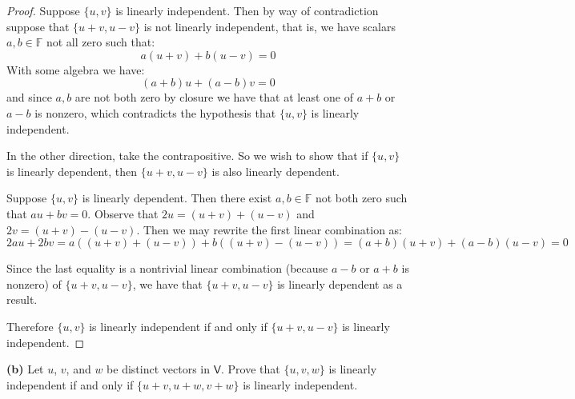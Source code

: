 \documentclass[11pt]{article}
\newcommand{\br}[1]{\left(#1\right)}
\newcommand{\cbr}[1]{\{#1\}}
\begin{document}
\begin{proof}
    Suppose $\cbr{u,v}$ is linearly independent. Then by way of contradiction suppose that $\cbr{u+v,u-v}$ is not linearly independent, that is, we have scalars $a,b\in\mathbb{F}$ not all zero such that: $$a\br{u+v}+b\br{u-v} = 0$$ With some algebra we have: $$\br{a+b}u+\br{a-b}v = 0$$ and since $a,b$ are not both zero by closure we have that at least one of $a+b$ or $a-b$ is nonzero, which contradicts the hypothesis that $\cbr{u,v}$ is linearly independent.

    In the other direction, take the contrapositive. So we wish to show that if $\cbr{u,v}$ is linearly dependent, then $\cbr{u+v,u-v}$ is also linearly dependent.

    Suppose $\cbr{u,v}$ is linearly dependent. Then there exist $a,b\in\mathbb{F}$ not both zero such that $au+bv = 0$. Observe that $2u = \br{u+v} + \br{u-v}$ and $2v = \br{u+v} - \br{u-v}$. Then we may rewrite the first linear combination as: $$2au+2bv = a\br{\br{u+v} + \br{u-v}} + b\br{\br{u+v} - \br{u-v}} = \br{a+b}\br{u+v} + \br{a-b}\br{u-v} = 0$$

    Since the last equality is a nontrivial linear combination (because $a-b$ or $a+b$ is nonzero) of $\cbr{u+v,u-v}$, we have that $\cbr{u+v,u-v}$ is linearly dependent as a result.

    Therefore $\cbr{u,v}$ is linearly independent if and only if $\cbr{u+v,u-v}$ is linearly independent.
\end{proof}

\textbf{(b)} Let $u$, $v$, and $w$ be distinct vectors in $\mathsf{V}$. Prove that $\cbr{u,v,w}$ is linearly independent if and only if $\cbr{u+v,u+w,v+w}$ is linearly independent.
\end{document}
